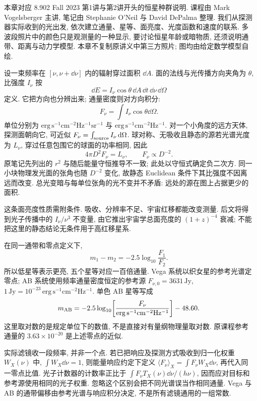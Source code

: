 
本章对应 8.902 Fall 2023 第1讲与第2讲开头的恒星种群说明. 课程由 Mark Vogelsberger 主讲, 笔记由 Stephanie O'Neil 与 David DePalma 整理. 我们从探测器实际收到的光出发, 依次建立通量、星等、面亮度、光度函数和速度的联系. 多波段照片中的颜色只是观测量的一种显示, 要讨论恒星年龄或暗物质, 还须说明通带、距离与动力学模型. 本章不复制原讲义中第三方照片; 图均由给定数学模型自绘.

设一束频率在 $[\nu,\nu+\dd\nu]$ 内的辐射穿过面积 $\dd A$. 面的法线与光传播方向夹角为 $\theta$, 比强度 $I_\nu$ 按
\[
\dd E=I_\nu\cos\theta\,\dd A\,\dd t\,\dd\nu\,\dd\Omega
\]
定义. 它把方向也分辨出来; 通量密度则对方向积分:
\[
F_\nu=\int I_\nu\cos\theta\dd\Omega.
\]
单位分别为 $\mathrm{erg\,s^{-1}cm^{-2}Hz^{-1}sr^{-1}}$ 与 $\mathrm{erg\,s^{-1}cm^{-2}Hz^{-1}}$. 对一个小角度的远方天体, 探测面朝向它, 可近似 $F_\nu=\int_{\rm source}I_\nu\,\mathrm d\Omega$. 球对称、无吸收且静态的源若光谱光度为 $L_\nu$, 穿过任意包围它的球面的功率相同, 因此
\[
4\pi D^2F_\nu=L_\nu,\qquad F_\nu\propto D^{-2}.
\]
原笔记先列出的 $r^2$ 与随后能量守恒推导不一致; 此处以守恒式确定负二次方. 同一小块物理发光面的张角也随 $D^{-2}$ 变化, 故静态 Euclidean 条件下其比强度不因离远而改变. 总光变暗与每单位张角的光不变并不矛盾: 远处的源在图上占据更少的面积.

这条面亮度性质需附条件. 吸收、分辨率不足、宇宙红移都能改变测量. 后文将得到光子传播中的 $I_\nu/\nu^3$ 不变量, 由它推出宇宙学总面亮度的 $(1+z)^{-4}$ 衰减; 不能把这里的静态结论无条件用于高红移星系.

在同一通带和零点定义下,
\[
m_1-m_2=-2.5\log_{10}\frac{F_1}{F_2}.
\]
所以低星等表示更亮, 五个星等对应一百倍通量. Vega 系统以织女星的参考光谱定零点; AB 系统使用频率通量密度恒定的参考源 $F_{\nu,0}=3631\,\mathrm{Jy}$, $1\,\mathrm{Jy}=10^{-23}\,\mathrm{erg\,s^{-1}cm^{-2}Hz^{-1}}$. 单色 AB 星等写成
\[
m_{\rm AB}=-2.5\log_{10}\!\left[\frac{F_\nu}{\mathrm{erg\,s^{-1}cm^{-2}Hz^{-1}}}\right]-48.60.
\]
这里取对数的是规定单位下的数值, 不是直接对有量纲物理量取对数. 原课程参考通量的 $3.63\times10^{-20}$ 是上述零点的近似.

实际滤镜收一段频率, 并非一个点. 若已把响应及探测方式吸收到归一化权重 $W_X(\nu)$ 中, $\int W_X\dd\nu=1$, 则能量响应约定下定义 $\langle F_\nu\rangle_X=\int F_\nu W_X\dd\nu$, 再代入同一零点比值. 光子计数器的计数率正比于 $\int F_\nu T_X(\nu)\dd\nu/(h\nu)$, 因而应对目标和参考源使用相同的光子权重. 忽略这个区别会把不同光谱误当作相同通量. Vega 与 AB 的通带偏移由参考光谱与响应积分决定, 不是所有滤镜通用的一组常数.

